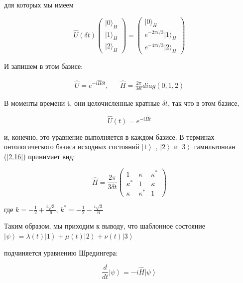 \documentclass[main.tex]{subfiles}
\begin{document}
для которых мы имеем

\begin{equation}\label{2.15}
	\hat U(\delta t)\left(\begin{array}{c}{|0\rangle_{H}} \\ {|1\rangle_{H}} \\ {|2\rangle_{H}}\end{array}\right)=\left(\begin{array}{c}{|0\rangle_{H}} \\ {e^{-2 \pi i / 3}|1\rangle_{H}} \\ {e^{-4 \pi i / 3}|2\rangle_{H}}\end{array}\right)
\end{equation}

И запишем в этом базисе:

\begin{align}\label{2.16}
	\hat U = e^{-i\hat H\delta t}, && 
	\hat H =\frac{2\pi}{3\delta t} diag(0,1,2)
\end{align}

В моменты времени t, они целочисленные кратные $\delta t$, так что в этом базисе,

\begin{equation}\label{2.17}
	\hat U(t) = e^{-i\hat H t}
\end{equation}

и, конечно, это уравнение выполняется в каждом базисе. В терминах онтологического базиса исходных состояний $\left|1\right>$ , $\left|2\right>$ и $\left|3\right>$ гамильтониан (\ref{2.16}) принимает вид:

\begin{equation}\label{2.18}
	\hat H=\frac{2 \pi}{3 \delta t}\left(\begin{array}{ccc}{1} & {\kappa} & {\kappa^{*}} \\ {\kappa^{*}} & {1} & {\kappa} \\ {\kappa} & {\kappa^{*}} & {1}\end{array}\right)
\end{equation}

где $k = -\frac 1 2 + \frac{i\sqrt 3}{6}$, $k^* = -\frac 1 2-\frac{i\sqrt 3}{6}$

Таким образом, мы приходим к выводу, что шаблонное состояние $\left|\psi\right> = \lambda(t)\left|1\right> + \mu(t)\left|2\right> + \nu(t)\left|3\right>$

подчиняется уравнению Шредингера:

\begin{equation}\label{2.19}
	\frac d {dt} \left|\psi\right> = -i \hat H \left|\psi\right> 
\end{equation}
\end{document}
